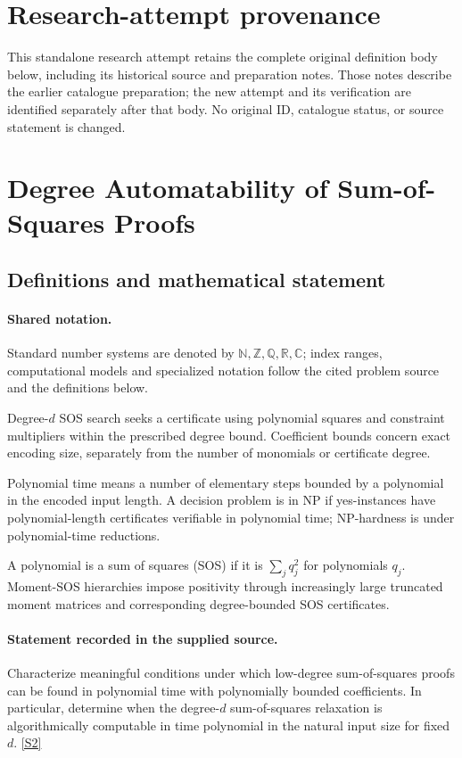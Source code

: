 \documentclass[11pt]{article}
\begin{document}
\section*{Research-attempt provenance}
This standalone research attempt retains the complete original definition body below,
including its historical source and preparation notes. Those notes describe the
earlier catalogue preparation; the new attempt and its verification are identified
separately after that body. No original ID, catalogue status, or source statement is changed.

\section{Degree Automatability of Sum-of-Squares Proofs}\label{statement}

\subsection{Definitions and mathematical statement}

\paragraph{Shared notation.}Standard number systems are denoted by $\mathbb N,\mathbb Z,\mathbb Q,\mathbb R,\mathbb C$; index ranges, computational models and specialized notation follow the cited problem source and the definitions below.


Degree-$d$ SOS search seeks a certificate using polynomial squares and constraint multipliers within the prescribed degree bound. Coefficient bounds concern exact encoding size, separately from the number of monomials or certificate degree.

Polynomial time means a number of elementary steps bounded by a polynomial in the encoded input length. A decision problem is in $\mathrm{NP}$ if yes-instances have polynomial-length certificates verifiable in polynomial time; NP-hardness is under polynomial-time reductions.

A polynomial is a sum of squares (SOS) if it is $\sum_j q_j^2$ for polynomials $q_j$. Moment-SOS hierarchies impose positivity through increasingly large truncated moment matrices and corresponding degree-bounded SOS certificates.
\paragraph{Statement recorded in the supplied source.}
Characterize meaningful conditions under which low-degree sum-of-squares proofs can be found in polynomial time with polynomially bounded coefficients. In particular, determine when the degree-$d$ sum-of-squares relaxation is algorithmically computable in time polynomial in the natural input size for fixed $d$. \href{https://doi.org/10.4171/owr/2025/9}{[S2]}
\end{document}
